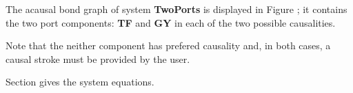 

   The acausal bond graph of system \textbf{TwoPorts} is
   displayed in Figure ; it contains the two
   port components: \textbf{TF} and \textbf{GY} in each of
   the two possible causalities.
   
   Note that the neither component has prefered causality and, in both
   cases, a causal stroke must be provided by the user. 
   
   Section  gives the system equations.

